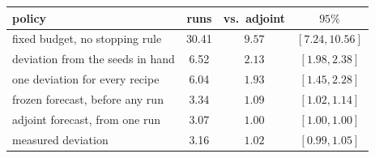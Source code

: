 \begin{tabular}{lccc}
  \toprule
  policy & runs & vs.\ adjoint & $95\%$ \\
  \midrule
    fixed budget, no stopping rule & 30.41 & $9.57$ & $[7.24, 10.56]$ \\
    deviation from the seeds in hand & 6.52 & $2.13$ & $[1.98, 2.38]$ \\
    one deviation for every recipe & 6.04 & $1.93$ & $[1.45, 2.28]$ \\
    frozen forecast, before any run & 3.34 & $1.09$ & $[1.02, 1.14]$ \\
    adjoint forecast, from one run & 3.07 & $1.00$ & $[1.00, 1.00]$ \\
    measured deviation & 3.16 & $1.02$ & $[0.99, 1.05]$ \\
  \bottomrule
\end{tabular}